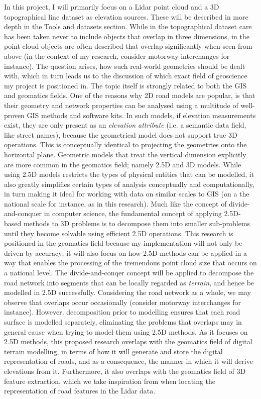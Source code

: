 In this project, I will primarily focus on a Lidar point cloud and a 3D topographical line dataset as elevation sources. These will be described in more depth in the Tools and datasets section. While in the topographical dataset care has been taken never to include objects that overlap in three dimensions, in the point cloud objects are often described that overlap significantly when seen from above (in the context of my research, consider motorway interchanges for instance). The question arises, how such real-world geometries should be dealt with, which in turn leads us to the discussion of which exact field of geoscience my project is positioned in. The topic itself is strongly related to both the GIS and geomatics fields. One of the reasons why 2D road models are popular, is that their geometry and network properties can be analysed using a multitude of well-proven GIS methods and software kits. In such models, if elevation measurements exist, they are only present as an \textit{elevation attribute} (i.e. a semantic data field, like street names), because the geometrical model does not support true 3D operations. This is conceptually identical to projecting the geometries onto the horizontal plane. Geometric models that treat the vertical dimension explicitly are more common in the geomatics field; namely 2.5D and 3D models. While using 2.5D models restricts the types of physical entities that can be modelled, it also greatly simplifies certain types of analysis conceptually and computationally, in turn making it ideal for working with data on similar scales to GIS (on a the national scale for instance, as in this research). Much like the concept of divide-and-conquer in computer science, the fundamental concept of applying 2.5D-based methods to 3D problems is to decompose them into smaller sub-problems until they become solvable using efficient 2.5D operations. This research is positioned in the geomatics field because my implementation will not only be driven by accuracy; it will also focus on how 2.5D methods can be applied in a way that enables the processing of the tremendous point cloud size that occurs on a national level. The divide-and-conqer concept will be applied to decompose the road network into segments that can be locally regarded as \textit{terrain}, and hence be modelled in 2.5D successfully. Considering the road network as a whole, we may observe that overlaps occur occasionally (consider motorway interchanges for instance). However, decomposition prior to modelling ensures that each road surface is modelled separately, eliminating the problems that overlaps may in general cause when trying to model them using 2.5D methods. As it focuses on 2.5D methods, this proposed research overlaps with the geomatics field of digital terrain modelling, in terms of how it will generate and store the digital representation of roads, and as a consequence, the manner in which it will derive elevations from it. Furthermore, it also overlaps with the geomatics field of 3D feature extraction, which we take inspiration from when locating the representation of road features in the Lidar data.





